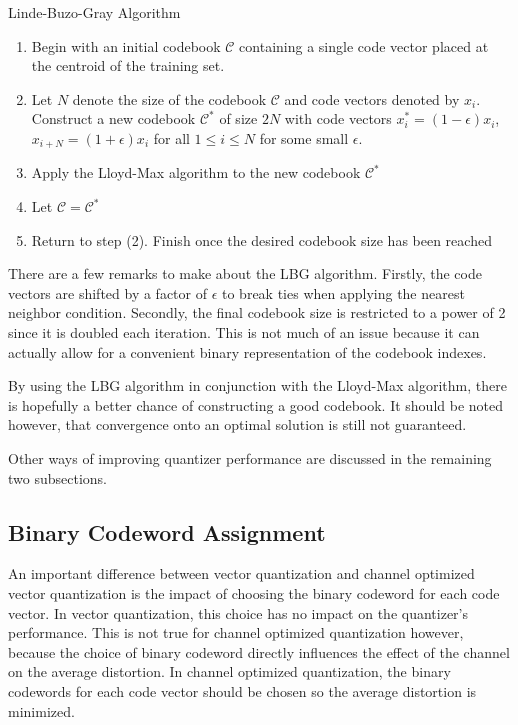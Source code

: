 {\sc \noindent Linde-Buzo-Gray Algorithm}
\begin{enumerate}
\item Begin with an initial codebook $\mathcal{C}$ containing a single code vector placed at the centroid of the training set.
  \item Let $N$ denote the size of the codebook $\mathcal{C}$ and code vectors denoted by $x_i$. Construct a new codebook $\mathcal{C}^*$ of size $2N$ with code vectors $x_i^* = (1-\epsilon)x_i$, $x_{i+N} = (1+\epsilon)x_i$ for all $1 \le i \le N$ for some small $\epsilon$.
\item Apply the Lloyd-Max algorithm to the new codebook $\mathcal{C}^*$
\item Let $\mathcal{C}=\mathcal{C}^*$
\item Return to step (2). Finish once the desired codebook size has been reached
\end{enumerate}
There are a few remarks to make about the LBG algorithm. Firstly, the code vectors are shifted by a factor of $\epsilon$ to break ties when applying the nearest neighbor condition. Secondly, the final codebook size is restricted to a power of 2 since it is doubled each iteration. This is not much of an issue because it can actually allow for a convenient binary representation of the codebook indexes.

By using the LBG algorithm in conjunction with the Lloyd-Max algorithm, there is hopefully a better chance of constructing a good codebook. It should be noted however, that convergence onto an optimal solution is still not guaranteed.

Other ways of improving quantizer performance are discussed in the remaining two subsections.

\subsection{Binary Codeword Assignment}
\label{sec:code_assign}
An important difference between vector quantization and channel optimized vector quantization is the impact of choosing the binary codeword for each code vector. In vector quantization, this choice has no impact on the quantizer's performance. This is not true for channel optimized quantization however, because the choice of binary codeword directly influences the effect of the channel on the average distortion. In channel optimized quantization, the binary codewords for each code vector should be chosen so the average distortion is minimized.

